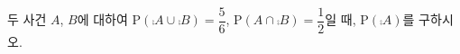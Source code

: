 두 사건 $A$, $B$에 대하여 $\mathrm{P}(\comp{A}\cup\comp{B})=\dfrac{5}{6}$, $\mathrm{P}(A\cap\comp{B})=\dfrac{1}{2}$일 때, $\mathrm{P}(\comp{A})$를 구하시오.

